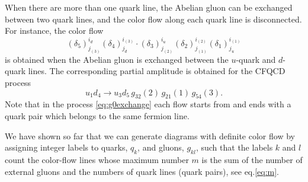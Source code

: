 \documentclass[a4paper,11pt]{article}
\begin{document}
When there are more than one quark line, the Abelian gluon can be
exchanged between two quark lines, and the color flow along each quark
line is disconnected. For instance, the color flow
\begin{equation}
 (\delta_5)^{i_d}_{j_{(3)}}(\delta_4)^{i_{(3)}}_{j_d}\cdot
  (\delta_3)^{i_u}_{j_{(2)}}(\delta_2)^{i_{(2)}}_{j_{(1)}}(\delta_1)^{i_{(1)}}_{j_u}
\end{equation}
is obtained when the Abelian gluon is exchanged between the $u$-quark and
$d$-quark lines. The corresponding partial amplitude is obtained for the
CFQCD process
  \begin{equation}
u_1d_4\rightarrow u_3d_5\,g_{32}(2)\,g_{21}(1)\,g_{54}(3).
\label{eq:g0exchange}
  \end{equation}
Note that in the process \eqref{eq:g0exchange} each flow starts from and ends
with a quark pair which belongs to the same fermion line.

We have shown so far that we can generate diagrams with definite
color flow by assigning integer labels to quarks, $q_k$, and gluons, $g_{kl}$, such that the labels $k$ and $l$ count the color-flow lines
whose maximum number $m$ is the sum of the number of external gluons and
the numbers of quark lines (quark pairs), see eq.\eqref{eq:m}.
\end{document}
